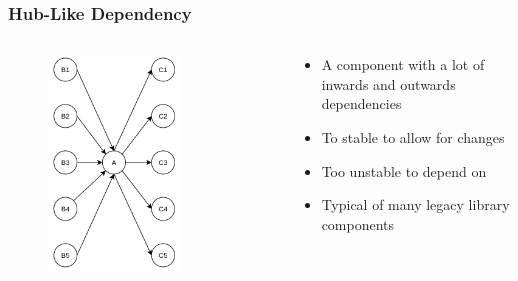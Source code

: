 \documentclass[dvipsnames, 10pt, table]{beamer}
\begin{document}
\begin{frame}
  \frametitle{Hub-Like Dependency}
  \begin{columns}
    \begin{column}{0.5\textwidth}
      \begin{figure}
        \begin{center}
          \includegraphics[width=0.7\textwidth]{figures/architectural-smells/hub-like-dependency.png}
        \end{center}
      \end{figure}
    \end{column}
    \begin{column}{0.5\textwidth}
      \begin{itemize}
        \item A component with a lot of inwards and outwards dependencies
        \item To stable to allow for changes
        \item Too unstable to depend on
        \item Typical of many legacy library components
      \end{itemize}
    \end{column}
  \end{columns}
\end{frame}
\end{document}
